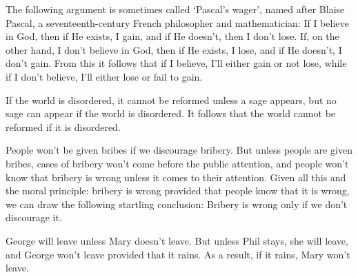 \begin{enumerate}
\begin{statement}{ The following argument is sometimes called ‘Pascal's wager',
    named after Blaise Pascal, a seventeenth-century French philosopher and
    mathematician: If I believe in God, then if He exists, I gain, and if He
    doesn't, then I don't lose. If, on the other hand, I don't believe in God,
    then if He exists, I lose, and if He doesn't, I don't gain. From this it
    follows that if I believe, I'll either gain or not lose, while if I don't
    believe, I'll either lose or fail to gain.}
\end{statement}

\begin{statement} {If the world is disordered, it cannot be reformed unless a
    sage appears, but no sage can appear if the world is disordered. It follows
    that the world cannot be reformed if it is disordered.}
\end{statement}

\begin{statement} { People won't be given bribes if we discourage bribery. But
    unless people are given bribes, cases of bribery won't come before the
    public attention, and people won't know that bribery is wrong unless it
    comes to their attention. Given all this and the moral principle: bribery is
    wrong provided that people know that it is wrong, we can draw the following
    startling conclusion: Bribery is wrong only if we don't discourage it. }
\end{statement}

\begin{statement} {George will leave unless Mary doesn't leave. But unless Phil
    stays, she will leave, and George won't leave provided that it rains. As a
    result, if it rains, Mary won't leave. }
\end{statement}


\end{enumerate}
